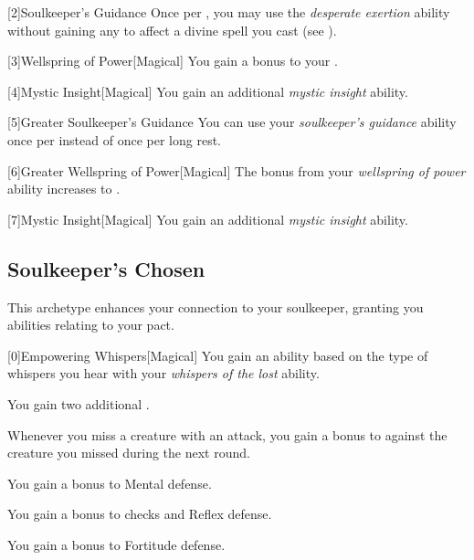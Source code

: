         [2]{Soulkeeper's Guidance} Once per , you may use the \textit{desperate exertion} ability without gaining any  to affect a divine spell you cast (see ).

        [3]{Wellspring of Power}[Magical]
        You gain a  bonus to your  .

        [4]{Mystic Insight}[Magical]
        You gain an additional \textit{mystic insight} ability.

        [5]{Greater Soulkeeper's Guidance} You can use your \textit{soulkeeper's guidance} ability once per  instead of once per long rest.

        [6]{Greater Wellspring of Power}[Magical]
        The bonus from your \textit{wellspring of power} ability increases to .

        [7]{Mystic Insight}[Magical]
        You gain an additional \textit{mystic insight} ability.

    \newpage
    \subsection{Soulkeeper's Chosen}
        This archetype enhances your connection to your soulkeeper, granting you abilities relating to your pact.

        [0]{Empowering Whispers}[Magical]
        You gain an ability based on the type of whispers you hear with your \textit{whispers of the lost} ability.
        {
             You gain two additional .

             Whenever you miss a creature with an attack, you gain a  bonus to  against the creature you missed during the next round.

             You gain a  bonus to Mental defense.

             You gain a  bonus to  checks and Reflex defense.

             You gain a  bonus to Fortitude defense.
        }

